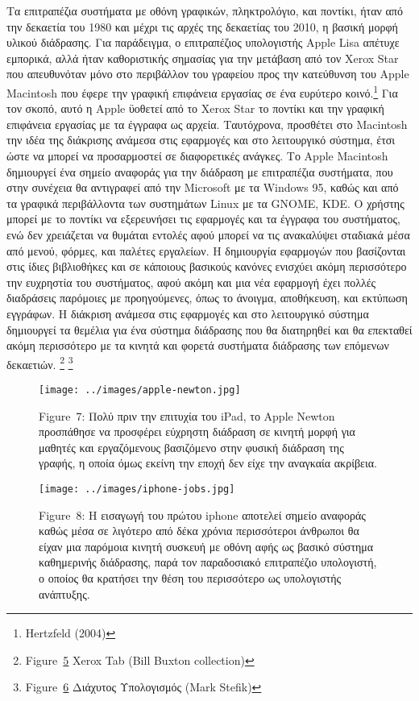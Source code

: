 \documentclass[
]{article}
\begin{document}
Τα επιτραπέζια συστήματα με οθόνη γραφικών, πληκτρολόγιο, και ποντίκι,
ήταν από την δεκαετία του 1980 και μέχρι τις αρχές της δεκαετίας του
2010, η βασική μορφή υλικού διάδρασης. Για παράδειγμα, ο επιτραπέζιος
υπολογιστής Apple Lisa απέτυχε εμπορικά, αλλά ήταν καθοριστικής σημασίας
για την μετάβαση από τον Xerox Star που απευθυνόταν μόνο στο περιβάλλον
του γραφείου προς την κατεύθυνση του Apple Macintosh που έφερε την
γραφική επιφάνεια εργασίας σε ένα ευρύτερο κοινό.\footnote{Hertzfeld
  (2004)} Για τον σκοπό, αυτό η Apple ϋοθετεί από το Xerox Star το
ποντίκι και την γραφική επιφάνεια εργασίας με τα έγγραφα ως αρχεία.
Ταυτόχρονα, προσθέτει στο Macintosh την ιδέα της διάκρισης ανάμεσα στις
εφαρμογές και στο λειτουργικό σύστημα, έτσι ώστε να μπορεί να
προσαρμοστεί σε διαφορετικές ανάγκες. Το Apple Macintosh δημιουργεί ένα
σημείο αναφοράς για την διάδραση με επιτραπέζια συστήματα, που στην
συνέχεια θα αντιγραφεί από την Microsoft με τα Windows 95, καθώς και από
τα γραφικά περιβάλλοντα των συστημάτων Linux με τα GNOME, KDE. Ο χρήστης
μπορεί με το ποντίκι να εξερευνήσει τις εφαρμογές και τα έγγραφα του
συστήματος, ενώ δεν χρειάζεται να θυμάται εντολές αφού μπορεί να τις
ανακαλύψει σταδιακά μέσα από μενού, φόρμες, και παλέτες εργαλείων. Η
δημιουργία εφαρμογών που βασίζονται στις ίδιες βιβλιοθήκες και σε
κάποιους βασικούς κανόνες ενισχύει ακόμη περισσότερο την ευχρηστία του
συστήματος, αφού ακόμη και μια νέα εφαρμογή έχει πολλές διαδράσεις
παρόμοιες με προηγούμενες, όπως το άνοιγμα, αποθήκευση, και εκτύπωση
εγγράφων. Η διάκριση ανάμεσα στις εφαρμογές και στο λειτουργικό σύστημα
δημιουργεί τα θεμέλια για ένα σύστημα διάδρασης που θα διατηρηθεί και θα
επεκταθεί ακόμη περισσότερο με τα κινητά και φορετά συστήματα διάδρασης
των επόμενων δεκαετιών. \footnote{Figure~\protect\hyperlink{fig:xerox-parc-tab}{5}
  Xerox Tab (Bill Buxton collection)} \footnote{Figure~\protect\hyperlink{fig:tabs-pads-boards}{6}
  Διάχυτος Υπολογισμός (Mark Stefik)}

\leavevmode{}%
\begin{figure}
\hypertarget{fig:apple-newton}{%
\centering
\texttt{[image: ../images/apple-newton.jpg]}
\caption{Figure~7: Πολύ πριν την επιτυχία του iPad, το Apple Newton
προσπάθησε να προσφέρει εύχρηστη διάδραση σε κινητή μορφή για μαθητές
και εργαζόμενους βασιζόμενο στην φυσική διάδραση της γραφής, η οποία
όμως εκείνη την εποχή δεν είχε την αναγκαία
ακρίβεια.}\label{fig:apple-newton}
}
\end{figure}

\leavevmode{}%
\begin{figure}
\hypertarget{fig:iphone-jobs}{%
\centering
\texttt{[image: ../images/iphone-jobs.jpg]}
\caption{Figure~8: Η εισαγωγή του πρώτου iphone αποτελεί σημείο αναφοράς
καθώς μέσα σε λιγότερο από δέκα χρόνια περισσότεροι άνθρωποι θα είχαν
μια παρόμοια κινητή συσκευή με οθόνη αφής ως βασικό σύστημα καθημερινής
διάδρασης, παρά τον παραδοσιακό επιτραπέζιο υπολογιστή, ο οποίος θα
κρατήσει την θέση του περισσότερο ως υπολογιστής
ανάπτυξης.}\label{fig:iphone-jobs}
}
\end{figure}
\end{document}
